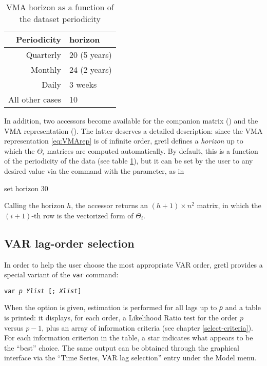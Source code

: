 \begin{table}[htbp]
  \centering
  \begin{tabular}{rl}
    \hline
    Periodicity & horizon \\
    \hline
    Quarterly & 20 (5 years) \\
    Monthly & 24 (2 years) \\
    Daily & 3 weeks \\
    All other cases & 10 \\
    \hline
  \end{tabular}
  \caption{VMA horizon as a function of the dataset periodicity}
  \label{tab:var-horizon}
\end{table}

In addition, two accessors become available for the companion matrix
() and the VMA representation (). The
latter deserves a detailed description: since the VMA representation
\eqref{eq:VMArep} is of infinite order, gretl defines a
\emph{horizon} up to which the $\Theta_i$ matrices are computed
automatically. By default, this is a function of the periodicity of
the data (see table \ref{tab:var-horizon}), but it can be set by the
user to any desired value via the  command with the
 parameter, as in
\begin{code}
set horizon 30
\end{code}
Calling the horizon $h$, the  accessor returns an $(h+1)
\times n^2$ matrix, in which the $(i+1)$-th row is the vectorized form
of $\Theta_i$.

\subsection{VAR lag-order selection}

In order to help the user choose the most appropriate VAR order,
gretl provides a special variant of the \texttt{var} command:
\begin{flushleft}
  \texttt{var \emph{p} \emph{Ylist} [; \emph{Xlist}]} 
\end{flushleft}
When the  option is given, estimation is performed
for all lags up to \texttt{\emph{p}} and a table is printed: it
displays, for each order, a Likelihood Ratio test for the order $p$
versus $p-1$, plus an array of information criteria (see chapter
\ref{select-criteria}). For each information criterion in the table, a
star indicates what appears to be the ``best'' choice. The same output
can be obtained through the graphical interface via the ``Time Series,
VAR lag selection'' entry under the Model menu.

